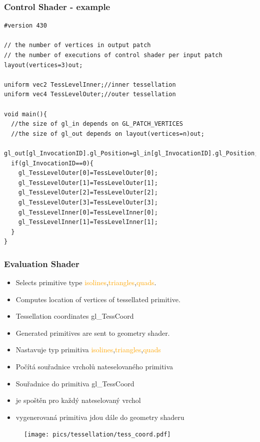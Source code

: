 \begin{frame}[fragile]
\frametitle{Control Shader - example}
	{\scriptsize
\begin{verbatim}
#version 430

// the number of vertices in output patch
// the number of executions of control shader per input patch
layout(vertices=3)out;

uniform vec2 TessLevelInner;//inner tessellation
uniform vec4 TessLevelOuter;//outer tessellation

void main(){
  //the size of gl_in depends on GL_PATCH_VERTICES
  //the size of gl_out depends on layout(vertices=n)out;
  gl_out[gl_InvocationID].gl_Position=gl_in[gl_InvocationID].gl_Position;
  if(gl_InvocationID==0){
    gl_TessLevelOuter[0]=TessLevelOuter[0];
    gl_TessLevelOuter[1]=TessLevelOuter[1];
    gl_TessLevelOuter[2]=TessLevelOuter[2];
    gl_TessLevelOuter[3]=TessLevelOuter[3];
    gl_TessLevelInner[0]=TessLevelInner[0];
    gl_TessLevelInner[1]=TessLevelInner[1];
  }
}
	\end{verbatim}
	}
\end{frame}

\begin{frame}
\frametitle{Evaluation Shader}
  \scriptsize
	\begin{itemize}
		\item Selects primitive type \textcolor{Orange}{isolines},\textcolor{orange}{triangles},\textcolor{orange}{quads}.
		\item Computes location of vertices of tessellated primitive.
		\item Tessellation coordinates \textcolor{OliveGreen}{gl\_TessCoord}
		\item Generated primitives are sent to geometry shader.
	\end{itemize}
	\begin{itemize}
		\item Nastavuje typ primitiva \textcolor{Orange}{isolines},\textcolor{orange}{triangles},\textcolor{orange}{quads}
		\item Počítá souřadnice vrcholů nateselovaného primitiva
		\item Souřadnice do primitiva \textcolor{OliveGreen}{gl\_TessCoord}
		\item je spoštěn pro každý nateselovaný vrchol
		\item vygenerovaná primitiva jdou dále do geometry shaderu
	\end{itemize}
	\begin{figure}[h]
	\texttt{[image: pics/tessellation/tess\_coord.pdf]}
	\end{figure}
\end{frame}


